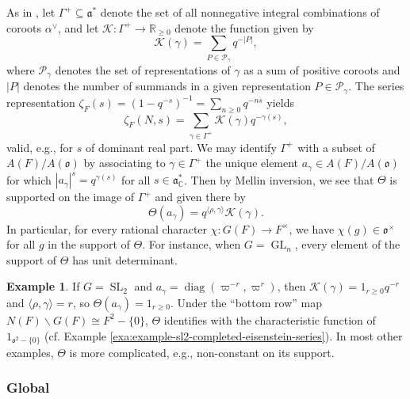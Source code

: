 \documentclass[reqno]{amsart}
\DeclareMathOperator{\SL}{SL}
\DeclareMathOperator{\GL}{GL}
\DeclareMathOperator{\diag}{diag}
\theoremstyle{plain} \newtheorem{theorem} {Theorem}
\theoremstyle{definition} \newtheorem{definition} [theorem] {Definition}
\newtheorem{example} [theorem] {Example}
\theoremstyle{itplain} %
\numberwithin{equation}{section}
\numberwithin{theorem}{section}
\renewcommand{\geq}{\geqslant}
\begin{document}
As in \cite[\S3.12]{MR1694894}, let $\Gamma^+ \subseteq \mathfrak{a}^*$ denote the set of all nonnegative integral combinations of coroots $\alpha^\vee$, and let $\mathcal{K} : \Gamma^+ \rightarrow \mathbb{R}_{\geq 0}$ denote the function given by
\begin{equation*}
  \mathcal{K}(\gamma) = \sum _{P \in \mathcal{P}_\gamma } q^{-|P|},
\end{equation*}
where $\mathcal{P}_\gamma$ denotes the set of representations of $\gamma$ as a sum of positive coroots and $|P|$ denotes the number of summands in a given representation $P \in \mathcal{P}_\gamma$.  The series representation $\zeta_F(s) = (1 - q^{-s})^{-1} = \sum_{n \geq 0} q^{-n s}$  yields
\begin{equation*}
  \zeta_F(N,s)
  =
  \sum _{\gamma \in \Gamma^+ }
  \mathcal{K}(\gamma)
  q^{- \gamma(s) },
\end{equation*}
valid, e.g., for $s$ of dominant real part.  We may identify $\Gamma^+$ with a subset of $A(F) / A(\mathfrak{o})$ by associating to $\gamma \in \Gamma^+$ the unique element $a_\gamma \in A(F) / A(\mathfrak{o})$ for which $|a_\gamma|^s = q^{\gamma(s)}$ for all $s \in \mathfrak{a}_{\mathbb{C}}^*$.  Then by Mellin inversion, we see that $\Theta$ is supported on the image of $\Gamma^+$ and given there by
\begin{equation*}
  \Theta(a_\gamma) = q^{ \langle \rho, \gamma  \rangle} \mathcal{K}(\gamma).
\end{equation*}
In particular, for every rational character $\chi : G(F) \rightarrow F^\times$, we have $\chi(g) \in \mathfrak{o}^\times$ for all $g$ in the support of $\Theta$.  For instance, when $G = \GL_n$, every element of the support of $\Theta$ has unit determinant.

\begin{example}
  If $G = \SL_2$ and $a_\gamma = \diag(\varpi^{-r}, \varpi^r)$, then $\mathcal{K}(\gamma) = 1_{r \geq 0} q^{-r}$ and $\langle \rho, \gamma  \rangle = r$, so $\Theta(a_\gamma) = 1_{r \geq 0}$.  Under the ``bottom row'' map $N(F) \backslash G(F) \cong F^2 - \{0\}$, $\Theta$ identifies with the characteristic function of $1_{\mathfrak{o}^2 - \{0\}}$ (cf. Example \ref{exa:example-sl2-completed-eisenstein-series}).  In most other examples, $\Theta$ is more complicated, e.g., non-constant on its support.
\end{example}



\subsubsection{Global}
\end{document}
